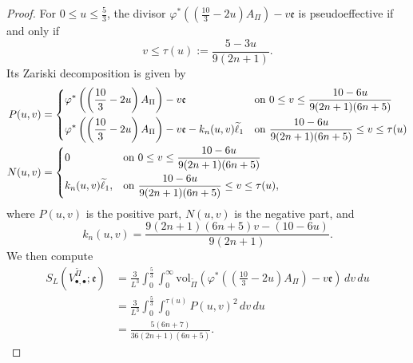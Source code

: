 \documentclass[12pt]{amsart}
\theoremstyle{definition}
\theoremstyle{remark}
\begin{document}
\begin{proof}
For $0\leq u\leq \frac{5}{3}$,  the divisor $\varphi^*\left(\left(\frac{10}{3}-2u\right) A_\Pi \right)- v \mathfrak{e}$ is pseudoeffective if and only if  $$v \leq \tau(u):=\frac{5-3u}{9(2n+1)}.$$ Its Zariski decomposition is given by
\[
\begin{split}
  P (u, v) &=
\begin{dcases}
\varphi^*\left(\left(\frac{10}{3}-2u\right) A_\Pi \right)- v \mathfrak{e}  &  \mbox{on } 0 \leq v \leq  \frac{10-6u}{9(2n+1)(6n+5)}  \\
\varphi^*\left(\left(\frac{10}{3}-2u\right) A_\Pi \right)- v \mathfrak{e}-k_n(u,v)\widetilde{\ell}_1 &
  \mbox{on }  \frac{10-6u}{9(2n+1)(6n+5)}  \leq v \leq \tau(u)\end{dcases} \\
N (u, v) &= 
\begin{dcases}
0 &   \mbox{on } 0 \leq v \leq  \frac{10-6u}{9(2n+1)(6n+5)} \\
k_n(u,v)\widetilde{\ell}_1, &    \mbox{on }  \frac{10-6u}{9(2n+1)(6n+5)}  \leq v \leq \tau(u),\end{dcases}
\end{split}
\]
where $P (u, v)$ is the positive part, $N (u, v) $ is the negative part, and 
$$k_n(u,v)=\frac{9(2n+1)(6n+5)v-(10-6u)}{9(2n+1)}.$$
We then compute
\begin{equation}\label{eq:W2dot}
\begin{split}
S_L (V_{\bullet, \bullet}^{\widetilde{\Pi}}; \mathfrak{e}) 
&= \frac{3}{L^3} \int_0^{\frac{5}{3}} \int_0^{\infty} \mathrm{vol}_{\widetilde{\Pi} }\left(\varphi^*\left(\left(\frac{10}{3}-2u\right) A_\Pi \right)- v \mathfrak{e} \right)\,dv \,du \\
&=  \frac{3}{L^3}\int_0^{\frac{5}{3}}  \int_0^{\tau(u)}P(u,v)^2\,dv \,du \\
&= \frac{5(6n+7)}{36(2n+1)(6n+5)}.
\end{split}
\end{equation}



\end{proof}
\end{document}
